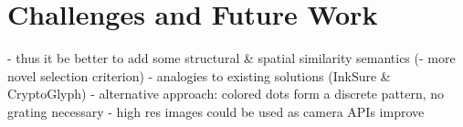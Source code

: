 \documentclass[thesis.tex]{subfiles}
\begin{document}
\section{Challenges and Future Work}
\begin{comment}

Ideally, the taggants would have been captured through a diffraction grating (or a prism)
Color calibration

analysis/match params are very static

There are mainly two modules responsible for the color-rendering accuracy of a digital camera: the former is the illuminant estimation and correction module, and the latter is the color matrix transformation aimed to adapt the color response of the sensor to a standard color space. These two modules together form what may be called the color correction pipeline.

RGB is a device-dependent color model: different devices detect or reproduce a given RGB value differently, since the color elements (such as phosphors or dyes) and their response to the individual R, G, and B levels vary from manufacturer to manufacturer, or even in the same device over time. Thus an RGB value does not define the same color across devices without some kind of color management.
\url{http://www.cis.rit.edu/~jxj1770/publications/paperEI_Xerox.pdf}
\url{http://www.cs.unc.edu/techreports/04-012.pdf}


\end{comment}

- thus it be better to add some structural \& spatial similarity semantics (- more novel selection criterion) - analogies to existing solutions (InkSure \& CryptoGlyph)
  - alternative approach: colored dots form a discrete pattern, no grating necessary
- high res images could be used as camera APIs improve
\end{document}
